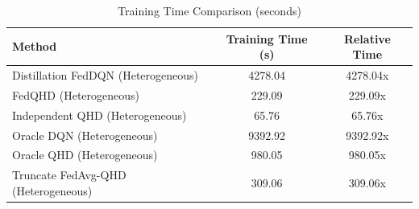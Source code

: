\begin{table}[t]
\centering
\caption{Training Time Comparison (seconds)}
\label{tab:computation_cost}
\begin{tabular}{lcc}
\toprule
Method & Training Time (s) & Relative Time \\
\midrule
Distillation FedDQN (Heterogeneous) & 4278.04 & 4278.04x \\
FedQHD (Heterogeneous) & 229.09 & 229.09x \\
Independent QHD (Heterogeneous) & 65.76 & 65.76x \\
Oracle DQN (Heterogeneous) & 9392.92 & 9392.92x \\
Oracle QHD (Heterogeneous) & 980.05 & 980.05x \\
Truncate FedAvg-QHD (Heterogeneous) & 309.06 & 309.06x \\
\bottomrule
\end{tabular}
\end{table}